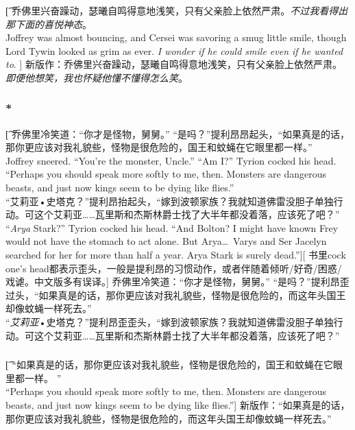\documentclass[12pt,a4paper]{article}
\begin{document}
\subsubsection{}\t[
	乔佛里兴奋躁动，瑟曦自鸣得意地浅笑，只有父亲脸上依然严肃。\emph{不过我看得出那下面的喜悦神态}。\\
	Joffrey was almost bouncing, and Cersei was savoring a smug little smile, though Lord Tywin looked as grim as ever. \emph{I wonder if he could smile even if he wanted to}. ]
	新版作：乔佛里兴奋躁动，瑟曦自鸣得意地浅笑，只有父亲脸上依然严肃。\emph{即便他想笑，我也怀疑他懂不懂得怎么笑}。
	
\subsubsection{\color{red}*}\t[	
	乔佛里冷笑道：“你才是怪物，舅舅。”
	“是吗？”提利昂昂起头，“如果真是的话，那你更应该对我礼貌些，怪物是很危险的，国王和蚊蝇在它眼里都一样。”\\
	Joffrey sneered. “You're the monster, Uncle.”
	“Am I?” Tyrion cocked his head. “Perhaps you should speak more softly to me, then. Monsters are dangerous beasts, and just now kings seem to be dying like flies.”\\
	“艾莉亚•史塔克？”提利昂抬起头，“嫁到波顿家族？我就知道佛雷没胆子单独行动。可这个艾莉亚……瓦里斯和杰斯林爵士找了大半年都没着落，应该死了吧？”\\
	“\emph{Arya} Stark?” Tyrion cocked his head. “And Bolton? I might have known Frey would not have the stomach to act alone. But Arya\ldots Varys and Ser Jacelyn searched for her for more than half a year. Arya Stark is surely dead.”][
	书里cock one's head都表示歪头，一般是提利昂的习惯动作，或者伴随着倾听/好奇/困惑/戏谑。中文版多有误译。]
	乔佛里冷笑道：“你才是怪物，舅舅。”
	“是吗？”提利昂歪过头，“如果真是的话，那你更应该对我礼貌些，怪物是很危险的，而这年头国王却像蚊蝇一样死去。”	\\
	“\emph{艾莉亚}•史塔克？”提利昂歪歪头，“嫁到波顿家族？我就知道佛雷没胆子单独行动。可这个艾莉亚……瓦里斯和杰斯林爵士找了大半年都没着落，应该死了吧？”
	
\subsubsection{}\t[
	“如果真是的话，那你更应该对我礼貌些，怪物是很危险的，国王和蚊蝇在它眼里都一样。 ”\\
	 “Perhaps you should speak more softly to me, then. Monsters are dangerous beasts, and just now kings seem to be dying like flies.”]
	 新版作：“如果真是的话，那你更应该对我礼貌些，怪物是很危险的，而这年头国王却像蚊蝇一样死去。”
	 
\end{document}
